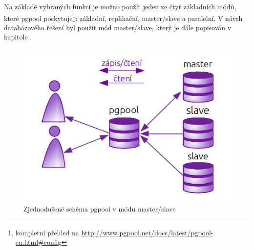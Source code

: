 Na základě vybraných funkcí je možno použít jeden ze čtyř základních módů, které pgpool poskytuje\footnote{kompletní přehled na \url{http://www.pgpool.net/docs/latest/pgpool-en.html\#config}}: základní, replikační, master/slave a paralelní. V návrh databázového řešení byl použit mód master/slave, který je dále popisován v kapitole .

      \begin{figure}[H]
        \centering
        \includegraphics[scale=1]{../../../grafy/obr/schema_pgpool.png}
        \caption{Zjednodušené schéma pgpool v módu master/slave}
        \label{opgpool}
      \end{figure}


